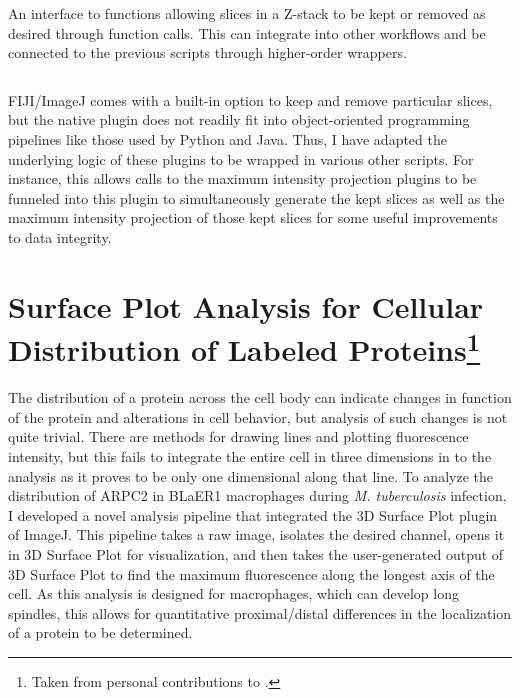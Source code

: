 \begin{code}
\caption{An interface to functions allowing slices in a Z-stack to be kept or removed as desired through function calls. This can integrate into other workflows and be connected to the previous scripts through higher-order wrappers.}
\label{reslicer}

\inputminted[breaklines,frame=single,fontsize=\small]{python}{source/reSlicer.py}

\end{code}

FIJI/ImageJ comes with a built-in option to keep and remove particular slices, but the native plugin does not readily fit into object-oriented programming pipelines like those used by Python and Java. Thus, I have adapted the underlying logic of these plugins to be wrapped in various other scripts. For instance, this allows calls to the maximum intensity projection plugins to be funneled into this plugin to simultaneously generate the kept slices as well as the maximum intensity projection of those kept slices for some useful improvements to data integrity. 

\section[Surface Plot Analysis for Cellular Distribution of Labeled Proteins]{Surface Plot Analysis for Cellular Distribution of Labeled Proteins\footnote{Taken from personal contributions to \citet{Saelens2022}.}}

The distribution of a protein across the cell body can indicate changes in function of the protein and alterations in cell behavior, but analysis of such changes is not quite trivial. There are methods for drawing lines and plotting fluorescence intensity, but this fails to integrate the entire cell in three dimensions in to the analysis as it proves to be only one dimensional along that line. To analyze the distribution of ARPC2 in BLaER1 macrophages during \textit{M. tuberculosis} infection, I developed a novel analysis pipeline that integrated the 3D Surface Plot plugin of ImageJ. This pipeline takes a raw image, isolates the desired channel, opens it in 3D Surface Plot for visualization, and then takes the user-generated output of 3D Surface Plot to find the maximum fluorescence along the longest axis of the cell. As this analysis is designed for macrophages, which can develop long spindles, this allows for quantitative proximal/distal differences in the localization of a protein to be determined.


